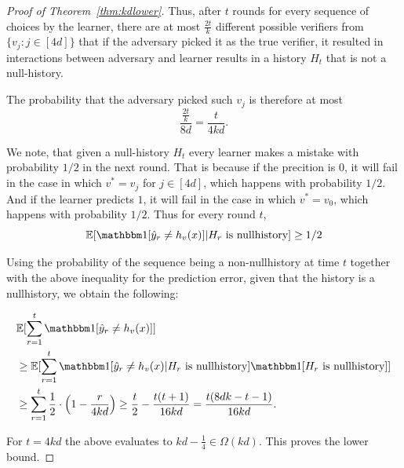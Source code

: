 \documentclass[11pt,letterpaper]{article}
\theoremstyle{definition}
\theoremstyle{plain}
\begin{document}
\begin{proof}[Proof of Theorem~\ref{thm:kdlower}]
Thus, after $t$ rounds for every sequence of choices by the learner, there are at most $\frac{2t}{k}$ different possible verifiers from $\{v_j: j\in [4d]\}$ that if the adversary picked it as the true verifier, it resulted in interactions between adversary and learner results in a history $H_t$ that is not a null-history.

The probability that the adversary picked such $v_j$ is therefore at most
\[ \frac{\frac{2t}{k}}{8d} = \frac{t}{4kd}.\]


We note, that given a null-history $H_t$ every learner makes a mistake with probability $1/2$ in the next round. That is because if the precition is $0$, it will fail in the case in which $v^*= v_j$ for $j\in [4d]$, which happens with probability $1/2$. And if the learner predicts $1$, it will fail in the case in which $v^* =v_0$, which happens with probability $1/2$.
Thus for every round $t$, 
\[\mathbb{E} [\indct[\hy_r \neq h_v(x)]|H_r \text{ is nullhistory}]  \geq 1/2\]

Using the probability of the sequence being a non-nullhistory at time $t$ together with the above inequality for the prediction error, given that the history is a nullhistory, we obtain the following:

\begin{align*}
   &\mathbb{E}[\sum_{r=1}^t  \indct[\hy_r \neq h_v(x)]]\\
   &\geq
   \mathbb{E} [\sum_{r=1}^t  \indct[\hy_r \neq h_v(x)|H_r \text{ is nullhistory}] \indct[H_r \text{ is nullhistory}]] \\
 & \geq \sum_{r=1}^t \frac{1}{2} \cdot \left(1-\frac{r}{4kd} \right)
   \geq \frac{t}{2}-\frac{t(t+1)}{16kd}  = \frac{t(8dk -t-1)}{16kd}.
\end{align*}

For $t = 4kd $ the above evaluates to $kd -\frac{1}{4} \in \Omega(kd)$. This proves the lower bound.
\end{proof}





\iffalse
\end{document}
